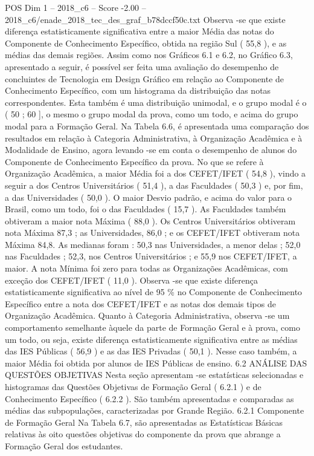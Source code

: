 \begin{textsample}{POS Dim 1 – 2018\_c6 – Score -2.00 – 2018\_c6/enade\_2018\_tec\_des\_graf\_b78dccf50c.txt}
Observa -se que existe diferença estatisticamente significativa entre a maior Média das notas do Componente de Conhecimento Específico, obtida na região Sul ( 55,8 ), e as médias das demais regiões.
Assim como nos Gráficos 6.1 e 6.2, no Gráfico 6.3, apresentado a seguir, é possível ser feita uma avaliação do desempenho de concluintes de Tecnologia em Design Gráfico em relação ao Componente de Conhecimento Específico, com um histograma da distribuição das notas correspondentes.
Esta também é uma distribuição unimodal, e o grupo modal é o ( 50 ; 60 ], o mesmo o grupo modal da prova, como um todo, e acima do grupo modal para a Formação Geral.
Na Tabela 6.6, é apresentada uma comparação dos resultados em relação à Categoria Administrativa, à Organização Acadêmica e à Modalidade de Ensino, agora levando -se em conta o desempenho de alunos do Componente de Conhecimento Específico da prova.
No que se refere à Organização Acadêmica, a maior Média foi a dos CEFET/IFET ( 54,8 ), vindo a seguir a dos Centros Universitários ( 51,4 ), a das Faculdades ( 50,3 ) e, por fim, a das Universidades ( 50,0 ).
O maior Desvio padrão, e acima do valor para o Brasil, como um todo, foi o das Faculdades ( 15,7 ).
As Faculdades também obtiveram a maior nota Máxima ( 88,0 ).
Os Centros Universitários obtiveram nota Máxima 87,3 ; as Universidades, 86,0 ; e os CEFET/IFET obtiveram nota Máxima 84,8.
As medianas foram : 50,3 nas Universidades, a menor delas ; 52,0 nas Faculdades ; 52,3, nos Centros Universitários ; e 55,9 nos CEFET/IFET, a maior.
A nota Mínima foi zero para todas as Organizações Acadêmicas, com exceção dos CEFET/IFET ( 11,0 ).
Observa -se que existe diferença estatisticamente significativa ao nível de 95 \% no Componente de Conhecimento Específico entre a nota dos CEFET/IFET e as notas dos demais tipos de Organização Acadêmica.
Quanto à Categoria Administrativa, observa -se um comportamento semelhante àquele da parte de Formação Geral e à prova, como um todo, ou seja, existe diferença estatisticamente significativa entre as médias das IES Públicas ( 56,9 ) e as das IES Privadas ( 50,1 ).
Nesse caso também, a maior Média foi obtida por alunos de IES Públicas de ensino. 6.2 ANÁLISE DAS QUESTÕES OBJETIVAS Nesta seção apresentam -se estatísticas selecionadas e histogramas das Questões Objetivas de Formação Geral ( 6.2.1 ) e de Conhecimento Específico ( 6.2.2 ).
São também apresentadas e comparadas as médias das subpopulações, caracterizadas por Grande Região. 6.2.1 Componente de Formação Geral Na Tabela 6.7, são apresentadas as Estatísticas Básicas relativas às oito questões objetivas do componente da prova que abrange a Formação Geral dos estudantes.

\end{textsample}
